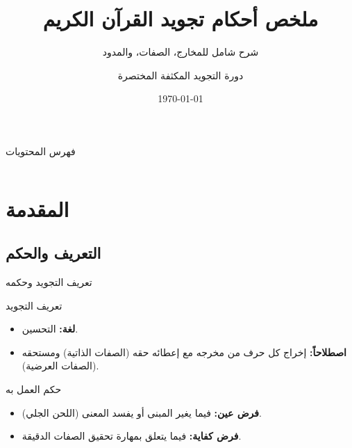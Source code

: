 \documentclass[aspectratio=169, 12pt]{beamer}
\title[أحكام التجويد]{ملخص أحكام تجويد القرآن الكريم}
\subtitle{شرح شامل للمخارج، الصفات، والمدود}
\author{دورة التجويد المكثفة المختصرة}
\institute{مبادئ في علم التجويد}
\date{\today}
\begin{document}
\begin{frame}
    \titlepage
\end{frame}

\begin{frame}{فهرس المحتويات}
    \begin{columns}[t]
        \raggedright %
        \tableofcontents[sections={1-3}]
        
        \raggedright %
        \tableofcontents[sections={4-7}]
    \end{columns}
\end{frame}

\section{المقدمة}
\subsection{التعريف والحكم}

\begin{frame}{تعريف التجويد وحكمه}
    \begin{block}{تعريف التجويد}
        \begin{itemize}
            \item \textbf{لغة:} التحسين.
            \item \textbf{اصطلاحاً:} إخراج كل حرف من مخرجه مع إعطائه حقه (الصفات الذاتية) ومستحقه (الصفات العرضية).
        \end{itemize}
    \end{block}

    \begin{block}{حكم العمل به}
        \begin{itemize}
            \item \textbf{فرض عين:} فيما يغير المبنى أو يفسد المعنى (اللحن الجلي).
            \item \textbf{فرض كفاية:} فيما يتعلق بمهارة تحقيق الصفات الدقيقة.
        \end{itemize}
    \end{block}
\end{frame}
\end{document}
